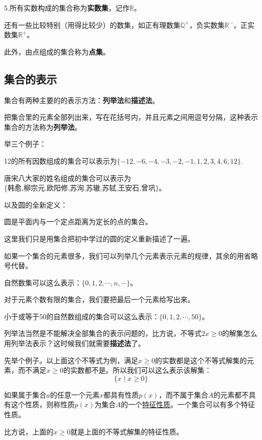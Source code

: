 \documentclass[lang=cn,math=cm,chinesefont=nofont,11pt,scheme=chinese]{elegantbook}
\begin{document}
5.所有实数构成的集合称为\textbf{实数集}，记作$\mathbb{R}$。

还有一些比较特别（用得比较少）的数集，如正有理数集$\mathbb{Q}^+$，负实数集$\mathbb{R}^-$，正实数集$\mathbb{R}^+$。

此外，由点组成的集合称为\textbf{点集}。

\subsection{集合的表示}
集合有两种主要的的表示方法：\textbf{列举法}和\textbf{描述法}。

把集合里的元素全部列出来，写在花括号内，并且元素之间用逗号分隔，这种表示集合的方法称为\textbf{列举法}。

举三个例子：

\begin{example}
  12的所有因数组成的集合可以表示为$\{-12,-6,-4,-3,-2,-1,1,2,3,4,6,12\}$.
\end{example}
\begin{example}
  唐宋八大家的姓名组成的集合可以表示为$\{\text{韩愈,柳宗元,欧阳修,苏洵,苏辙,苏轼,王安石,曾巩}\}$。
\end{example}
以及圆的全新定义：
\begin{definition}[圆]
  圆是平面内与一个定点距离为定长的点的集合。
\end{definition}
这里我们只是用集合把初中学过的圆的定义重新描述了一遍。

如果一个集合的元素很多，我们可以列举几个元素表示元素的规律，其余的用省略号代替。

\begin{example}
  自然数集可以这么表示：$\{0,1,2,\cdots,n,\cdots\}$。
\end{example}

对于元素个数有限的集合，我们要把最后一个元素给写出来。
\begin{example}
  小于或等于50的自然数组成的集合可以这么表示：$\{0,1,2,\cdots,50\}$。
\end{example}


列举法当然是不能解决全部集合的表示问题的，比方说，不等式$2x\geq 0$的解集怎么用列举法表示？这时候我们就需要\textbf{描述法}了。

先举个例子。以上面这个不等式为例，满足$x\geq 0$的实数都是这个不等式解集的元素，而不满足$x\geq 0$的实数都不是。所以我们可以这么表示该解集：
$$\{x\mid x\geq0\}$$

\begin{definition}[特征性质]
如果属于集合$a$的任意一个元素$x$都具有性质$p(x)$，而不属于集合$A$的元素都不具有这个性质，则称性质$p(x)$为集合$A$的一个\underline{特征性质}。一个集合可以有多个特征性质。
\end{definition}
比方说，上面的$x\geq 0$就是上面的不等式解集的特征性质。
\end{document}
